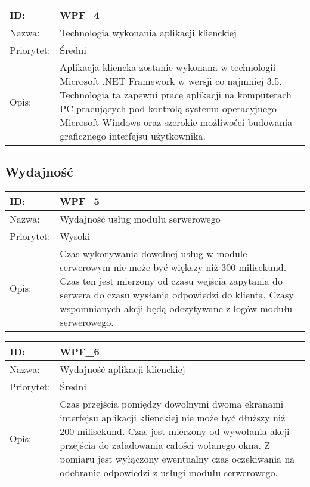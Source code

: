\begin{center}
\begin{tabular}[h]{|p{1.6cm}|p{13.5cm}|}
\hline
ID: & WPF\_4 \\ \hline
Nazwa: & Technologia wykonania aplikacji klienckiej \\ \hline
Priorytet: & Średni \\ \hline
Opis: & Aplikacja kliencka zostanie wykonana w technologii Microsoft .NET Framework w wersji co najmniej 3.5. Technologia ta zapewni pracę aplikacji na komputerach PC pracujących pod kontrolą systemu operacyjnego Microsoft Windows oraz szerokie możliwości budowania graficznego interfejsu użytkownika. \\
\hline
\end{tabular}
\end{center}

\subsection{Wydajność}
\begin{center}
\begin{tabular}[h]{|p{1.6cm}|p{13.5cm}|}
\hline
ID: & WPF\_5 \\ \hline
Nazwa: & Wydajność usług modułu serwerowego \\ \hline
Priorytet: & Wysoki \\ \hline
Opis: & Czas wykonywania dowolnej usług w module serwerowym nie może być większy niż 300 milisekund. Czas ten jest mierzony od czasu wejścia zapytania do serwera do czasu wysłania odpowiedzi do klienta. Czasy wspomnianych akcji będą odczytywane z logów modułu serwerowego. \\
\hline
\end{tabular}
\end{center}

\begin{center}
\begin{tabular}[h]{|p{1.6cm}|p{13.5cm}|}
\hline
ID: & WPF\_6 \\ \hline
Nazwa: & Wydajność aplikacji klienckiej \\ \hline
Priorytet: & Średni \\ \hline
Opis: & Czas przejścia pomiędzy dowolnymi dwoma ekranami interfejsu aplikacji klienckiej nie może być dłuższy niż 200 milisekund. Czas jest mierzony od wywołania akcji przejścia do załadowania całości wołanego okna. Z pomiaru jest wyłączony ewentualny czas oczekiwania na odebranie odpowiedzi z usługi modułu serwerowego. \\
\hline
\end{tabular}
\end{center}

